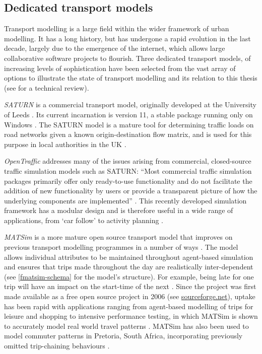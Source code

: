 \label{s:agent-based}
\subsection{Dedicated transport models}
\label{s:dedicated}
Transport modelling is a large field within the wider framework of
urban modelling. It has a long history, but has undergone a rapid
evolution in the last decade, largely due to the emergence of the
internet, which allows large collaborative software projects to flourish.
Three dedicated transport models, of increasing levels of sophistication
have been selected from the
vast array of options to illustrate the state of transport modelling
and its relation to this thesis
(see \citealp{Rasouli2012} for a technical review).

\emph{SATURN} is a commercial transport model, originally
developed at the University of
Leeds \citep{boxill2000evaluation}. Its current incarnation
is version 11, a stable package running only on Windows \citep{SATURN2012}.
The SATURN model is a mature tool for determining traffic loads on road
networks given a known origin-destination flow matrix,
and is used for this purpose in local authorities in the UK
\citep{boyce2005urban}.

\emph{OpenTraffic} addresses many of the issues arising from commercial,
closed-source traffic simulation models such as SATURN: ``Most commercial
traffic simulation packages primarily offer only ready-to-use
functionality and do not facilitate the addition of new
functionality by users or provide a transparent picture of how the
underlying components are implemented'' \citep[44]{Tamminga2012}.
This recently developed simulation framework has a modular design
and is therefore useful in a wide range of applications, from
`car follow' to activity planning \citep{Tamminga2012}.

\emph{MATSim} is a more mature open source transport model that improves
on previous transport modelling programmes in a number of ways
\citep{rieser2007agent}. 
The model allows individual attributes to be maintained throughout
agent-based simulation and ensures that trips made throughout the
day are realistically inter-dependent (see \cref{fmatsim-schema} for the
model's structure). For example, being late for one trip
will have an impact on the start-time of the next \citep{Balmer2009}.
Since the project was first made available as a free open source project
in 2006 (see \href{http://sourceforge.net/projects/matsim/files/MATSim/}{sourceforge.net}),
uptake has been rapid with applications ranging from agent-based
modelling of trips for leisure and shopping \citep{horni2009location}
to intensive
performance testing, in which MATSim is shown to accurately
model real world travel patterns \citep{balmer2008agenta, gao2010comparison}.
MATSim has also been used to model commuter patterns in Pretoria, South Africa,
incorporating previously omitted trip-chaining behaviours \citep{van2011agent}.

